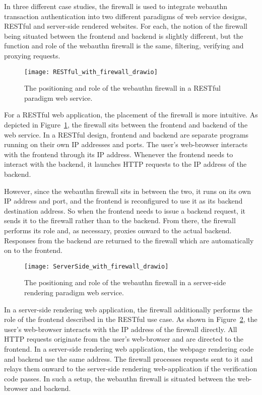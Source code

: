 In three different case studies, the firewall is used to integrate webauthn transaction authentication into two different paradigms of web service designs, RESTful and server-side rendered websites. For each, the notion of the firewall being situated between the frontend and backend is slightly different, but the function and role of the webauthn firewall is the same, filtering, verifying and proxying requests. 

\begin{figure}[h]
  \centering
  \texttt{[image: RESTful\_with\_firewall\_drawio]}
  \caption{The positioning and role of the webauthn firewall in a RESTful paradigm web service.}\label{Fig:ProxyingRequestsRESTful}
\end{figure}

For a RESTful web application, the placement of the firewall is more intuitive. As depicted in Figure~\ref{Fig:ProxyingRequestsRESTful}, the firewall sits between the frontend and backend of the web service. In a RESTful design, frontend and backend are separate programs running on their own IP addresses and ports. The user's web-browser interacts with the frontend through its IP address. Whenever the frontend needs to interact with the backend, it launches HTTP requests to the IP address of the backend. 

However, since the webauthn firewall sits in between the two, it runs on its own IP address and port, and the frontend is reconfigured to use it as its backend destination address. So when the frontend needs to issue a backend request, it sends it to the firewall rather than to the backend. From there, the firewall performs its role and, as necessary, proxies onward to the actual backend. Responses from the backend are returned to the firewall which are automatically on to the frontend. 

\begin{figure}[h]
  \centering
  \texttt{[image: ServerSide\_with\_firewall\_drawio]}
  \caption{The positioning and role of the webauthn firewall in a server-side rendering paradigm web service.}\label{Fig:ProxyingRequestsServerSide}
\end{figure}

In a server-side rendering web application, the firewall additionally performs the role of the frontend described in the RESTful use case. As shown in Figure~\ref{Fig:ProxyingRequestsServerSide}, the user's web-browser interacts with the IP address of the firewall directly. All HTTP requests originate from the user's web-browser and are directed to the frontend. In a server-side rendering web application, the webpage rendering code and backend use the same address. The firewall processes requests sent to it and relays them onward to the server-side rendering web-application if the verification code passes. In such a setup, the webauthn firewall is situated between the web-browser and backend.

